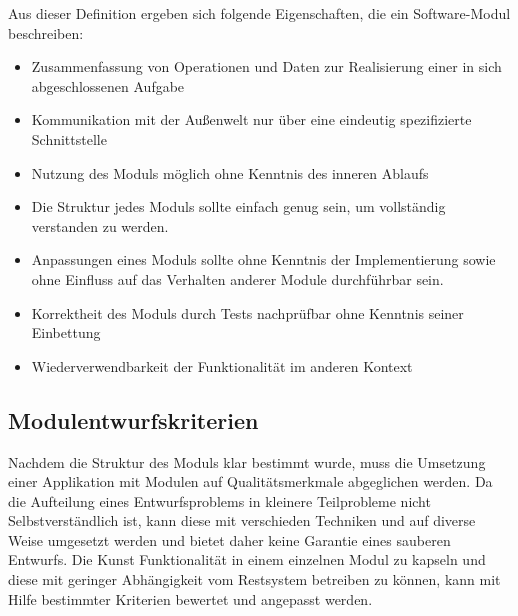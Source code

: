 Aus dieser Definition ergeben sich folgende Eigenschaften, die ein Software-Modul beschreiben:

\begin{itemize}
  \item Zusammenfassung von Operationen und Daten zur Realisierung einer in sich abgeschlossenen Aufgabe 
  \item Kommunikation mit der Außenwelt nur über eine eindeutig spezifizierte Schnittstelle 
  \item Nutzung des Moduls möglich ohne Kenntnis des inneren Ablaufs 
  \item Die Struktur jedes Moduls sollte einfach genug sein, um vollständig verstanden zu werden.
  \item Anpassungen eines Moduls sollte ohne Kenntnis der Implementierung sowie ohne Einfluss auf das Verhalten anderer Module durchführbar sein.
  \item Korrektheit des Moduls durch Tests nachprüfbar ohne Kenntnis seiner Einbettung
  \item Wiederverwendbarkeit der Funktionalität im anderen Kontext
\end{itemize}

  \subsection{Modulentwurfskriterien}
    Nachdem die Struktur des Moduls klar bestimmt wurde, muss die Umsetzung einer Applikation mit Modulen auf Qualitätsmerkmale abgeglichen werden. Da die Aufteilung eines Entwurfsproblems in kleinere Teilprobleme nicht Selbstverständlich ist, kann diese mit verschieden Techniken und auf diverse Weise umgesetzt werden und bietet daher keine Garantie eines sauberen Entwurfs. Die Kunst Funktionalität in einem einzelnen Modul zu kapseln und diese mit geringer Abhängigkeit vom Restsystem betreiben zu können, kann mit Hilfe bestimmter Kriterien bewertet und angepasst werden. \bigbreak
    
